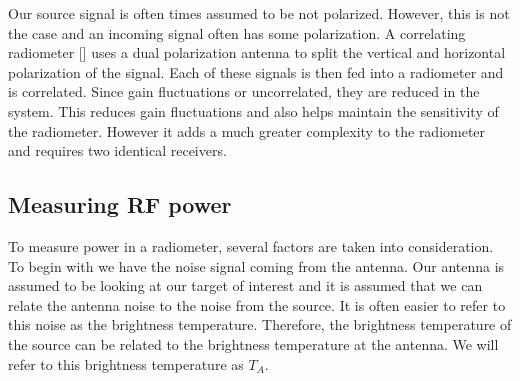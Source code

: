 Our source signal is often times assumed to be not polarized.  However, this is not the case and an incoming signal often has some polarization.  A correlating radiometer [\cite{Fujimoto}] uses a dual polarization antenna to split the vertical and horizontal polarization of the signal.  Each of these signals is then fed into a radiometer and is correlated.  Since gain fluctuations or uncorrelated, they are reduced in the system.  This reduces gain fluctuations and also helps maintain the sensitivity of the radiometer.  However it adds a much greater complexity to the radiometer and requires two identical receivers.  


\subsection{Measuring RF power}

To measure power in a radiometer, several factors are taken into consideration.  To begin with we have the noise signal coming from the antenna.  Our antenna is assumed to be looking at our target of interest and it is assumed that we can relate the antenna noise to the noise from the source.  It is often easier to refer to this noise as the brightness temperature.  Therefore, the brightness temperature of the source can be related to the brightness temperature at the antenna.  We will refer to this brightness temperature as $T_{A}$.  



